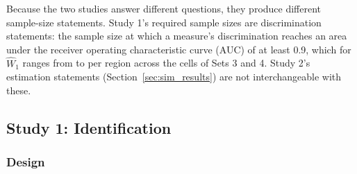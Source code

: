 \documentclass[AMA,Times1COL]{WileyNJDv5}
\begin{document}
Because the two studies answer different questions, they produce different sample-size statements. Study 1's required sample sizes are discrimination statements: the sample size at which a measure's discrimination reaches an area under the receiver operating characteristic curve (AUC) of at least 0.9, which for $\widehat{W}_1$ ranges from  to  per region across the cells of Sets 3 and 4. Study 2's estimation statements (Section~\ref{sec:sim_results}) are not interchangeable with these.

\subsection{Study 1: Identification}\label{sec:study1}


\subsubsection{Design}\label{sec:study1_design}
\end{document}

